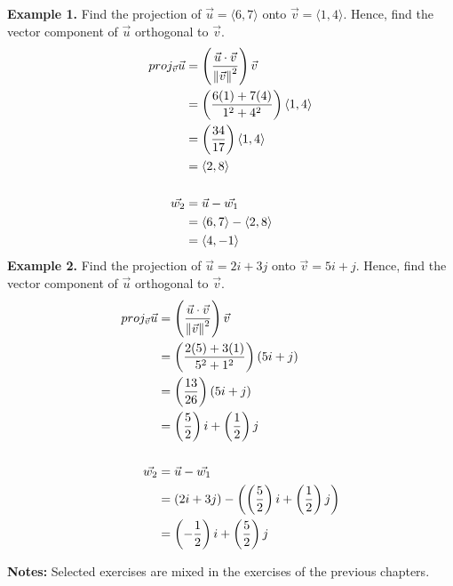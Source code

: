 \newpage
\noindent\textbf{Example 1. } Find the projection of $\vec{u} = \langle 6, 7 \rangle$ onto $\vec{v} = \langle 1, 4 \rangle$. Hence, find the vector component of $\vec{u}$ orthogonal to $\vec{v}$.
\begin{align*}
    proj_{\vec{v}}\vec{u} & = \left(\frac{\vec{u} \cdot \vec{v}}{\left\lVert\vec{v}\right\rVert^2}\right)\vec{v} \\
                          & = \left(\frac{6(1) + 7(4)}{1^2 + 4^2}\right)\langle 1, 4 \rangle     \\
                          & = \left(\frac{34}{17}\right)\langle 1, 4 \rangle                     \\
                          & = \langle 2, 8 \rangle                                               \\
    \\
    \vec{w_2}             & = \vec{u} - \vec{w_1}                                                \\
                          & = \langle 6, 7 \rangle - \langle 2, 8 \rangle                        \\
                          & = \langle 4, -1 \rangle
\end{align*}
\noindent\textbf{Example 2. } Find the projection of $\vec{u} = 2i + 3j$ onto $\vec{v} = 5i + j$. Hence, find the vector component of $\vec{u}$ orthogonal to $\vec{v}$.
\begin{align*}
    proj_{\vec{v}}\vec{u} & = \left(\frac{\vec{u} \cdot \vec{v}}{\left\lVert\vec{v}\right\rVert^2}\right)\vec{v}             \\
                          & = \left(\frac{2(5) + 3(1)}{5^2 + 1^2}\right)(5i + j)                             \\
                          & = \left(\frac{13}{26}\right)(5i + j)                                             \\
                          & = \left(\frac{5}{2}\right)i + \left(\frac{1}{2}\right)j                          \\
    \\
    \vec{w_2}             & = \vec{u} - \vec{w_1}                                                            \\
                          & = (2i + 3j) - \left(\left(\frac{5}{2}\right)i + \left(\frac{1}{2}\right)j\right) \\
                          & = \left(-\frac{1}{2}\right)i + \left(\frac{5}{2}\right)j
\end{align*}

\noindent\textbf{Notes:} Selected exercises are mixed in the exercises of the previous chapters.